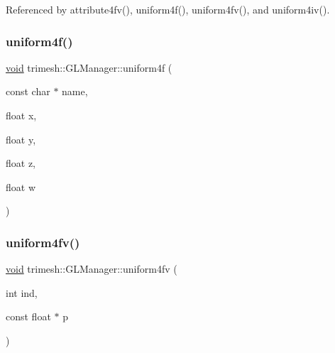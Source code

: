Referenced by attribute4fv(), uniform4f(), uniform4fv(), and uniform4iv().

\mbox{\label{classtrimesh_1_1GLManager_a8f8adeaaa0c79132f11386badfefe83d}} 
\subsubsection{\texorpdfstring{uniform4f()}{uniform4f()}\hspace{0.1cm}{\footnotesize\ttfamily [2/2]}}
{\footnotesize\ttfamily \hyperlink{namespacetrimesh_a784ddfd979e1c579bda795a8edfc3f43}{void} trimesh\+::\+G\+L\+Manager\+::uniform4f (\begin{DoxyParamCaption}\item[{const char $\ast$}]{name,  }\item[{float}]{x,  }\item[{float}]{y,  }\item[{float}]{z,  }\item[{float}]{w }\end{DoxyParamCaption})\hspace{0.3cm}{\ttfamily [inline]}}

\mbox{\label{classtrimesh_1_1GLManager_afdce0610ce4b1dc6571f5f1773946e81}} 
\subsubsection{\texorpdfstring{uniform4fv()}{uniform4fv()}\hspace{0.1cm}{\footnotesize\ttfamily [1/2]}}
{\footnotesize\ttfamily \hyperlink{namespacetrimesh_a784ddfd979e1c579bda795a8edfc3f43}{void} trimesh\+::\+G\+L\+Manager\+::uniform4fv (\begin{DoxyParamCaption}\item[{int}]{ind,  }\item[{const float $\ast$}]{p }\end{DoxyParamCaption})\hspace{0.3cm}{\ttfamily [inline]}}



